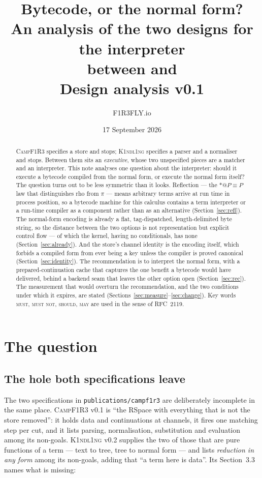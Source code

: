 \documentclass[11pt,a4paper]{article}
\title{\textbf{Bytecode, or the normal form?}\\[1mm]
\large An analysis of the two designs for the interpreter\\
between \Kind{} and \Camp\\[2mm]
\normalsize Design analysis v0.1}
\author{F1R3FLY.io}
\date{17 September 2026}
\newcommand{\code}[1]{\texttt{#1}}
\newcommand{\Kind}{\textsc{K1ndl1ng}}
\newcommand{\Camp}{\textsc{CampF1R3}}
\newcommand{\MUST}{\textsc{must}}
\newcommand{\MUSTNOT}{\textsc{must not}}
\newcommand{\SHOULD}{\textsc{should}}
\newcommand{\MAY}{\textsc{may}}
\theoremstyle{definition}
\theoremstyle{plain}
\begin{document}
\maketitle
\begin{abstract}
\noindent
\Camp{} specifies a store and stops; \Kind{} specifies a parser and a normaliser
and stops. Between them sits an \emph{executive}, whose two unspecified pieces
are a matcher and an interpreter. This note analyses one question about the
interpreter: should it execute a bytecode compiled from the normal form, or
execute the normal form itself? The question turns out to be less symmetric
than it looks. Reflection --- the $*@P\equiv P$ law that distinguishes rho from $\pi$ ---
means arbitrary terms arrive at run time in process position, so a bytecode machine
for this calculus contains a term interpreter or a run-time compiler as a
component rather than as an alternative (Section~\ref{sec:refl}). The
normal-form encoding is already a flat, tag-dispatched, length-delimited byte
string, so the distance between the two options is not representation but
explicit control flow --- of which the kernel, having no conditionals, has none
(Section~\ref{sec:already}). And the store's channel identity is the encoding
itself, which forbids a compiled form from ever being a key unless the compiler
is proved canonical (Section~\ref{sec:identity}). The recommendation is to
interpret the normal form, with a prepared-continuation cache that captures the
one benefit a bytecode would have delivered, behind a backend seam that leaves
the other option open (Section~\ref{sec:rec}). The measurement that would
overturn the recommendation, and the two conditions under which it expires, are
stated (Sections~\ref{sec:measure}--\ref{sec:change}).
Key words \MUST, \MUSTNOT, \SHOULD, \MAY{} are used in the sense of RFC~2119.
\end{abstract}
\tableofcontents
\section{The question}\label{sec:q}

\subsection{The hole both specifications leave}

The two specifications in \code{publications/campf1r3} are deliberately
incomplete in the same place. \Camp{} v0.1 is ``the RSpace with everything that
is not the store removed'': it holds data and continuations at channels, it
fires one matching step per cut, and it lists parsing, normalisation,
substitution and evaluation among its non-goals. \Kind{} v0.2 supplies the two
of those that are pure functions of a term --- text to tree, tree to normal form
--- and lists \emph{reduction in any form} among its non-goals, adding that ``a
term here is data''. Its Section~3.3 names what is missing:
\end{document}
